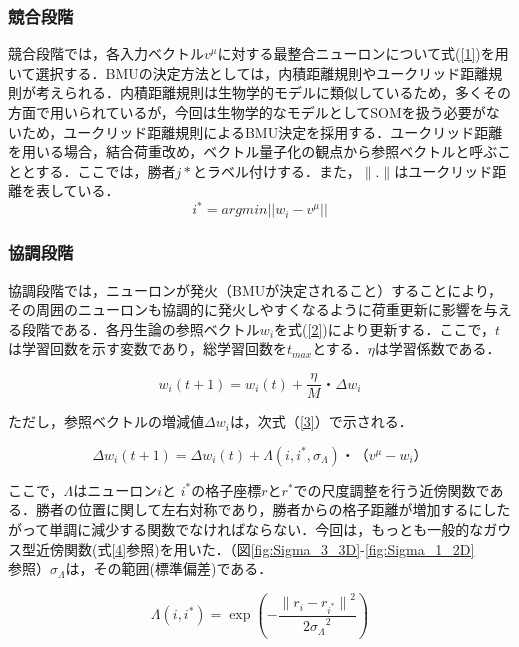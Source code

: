 \subsubsection{競合段階}
競合段階では，各入力ベクトル$v^\mu$に対する最整合ニューロンについて式(\ref{1})を用いて選択する．BMUの決定方法としては，内積距離規則やユークリッド距離規則が考えられる．内積距離規則は生物学的モデルに類似しているため，多くその方面で用いられているが，今回は生物学的なモデルとしてSOMを扱う必要がないため，ユークリッド距離規則によるBMU決定を採用する．ユークリッド距離を用いる場合，結合荷重改め，ベクトル量子化の観点から参照ベクトルと呼ぶこととする．ここでは，勝者$j*$とラベル付けする．また，$\|.\|$はユークリッド距離を表している．
\begin{equation}
\label{1}
  i^* = argmin||w_i - v^\mu||
\end{equation}

\subsubsection{協調段階}
協調段階では，ニューロンが発火（BMUが決定されること）することにより，その周囲のニューロンも協調的に発火しやすくなるように荷重更新に影響を与える段階である．各丹生論の参照ベクトル$w_i$を式(\ref{2})により更新する．ここで，$t$は学習回数を示す変数であり，総学習回数を$t_{max}$とする．$\eta$は学習係数である．

\begin{equation}
\label{2}
w_i(t+1) = w_i(t)+\frac{\eta}{M}・\Delta w_i
\end{equation}

ただし，参照ベクトルの増減値$\Delta w_i$は，次式（\ref{3}）で示される．

\begin{equation}
\label{3}
\Delta w_i(t +1) = \Delta w_i(t)+\Lambda(i,i^*,\sigma_\Lambda)・（v^\mu-w_i）
\end{equation}

ここで，$\Lambda$はニューロン$i$と $i^*$の格子座標$r$と$r^*$での尺度調整を行う近傍関数である．勝者の位置に関して左右対称であり，勝者からの格子距離が増加するにしたがって単調に減少する関数でなければならない．今回は，もっとも一般的なガウス型近傍関数(式\ref{4}参照)を用いた．（図\ref{fig:Sigma_3_3D}-\ref{fig:Sigma_1_2D}参照）$\sigma_\Lambda$は，その範囲(標準偏差)である．

\begin{equation}
\label{4}
\Lambda(i, i^*) = \exp(-\frac{{\|r_i-r_{i^*}\|}^2}{{2\sigma_\Lambda}^2})
\end{equation}

